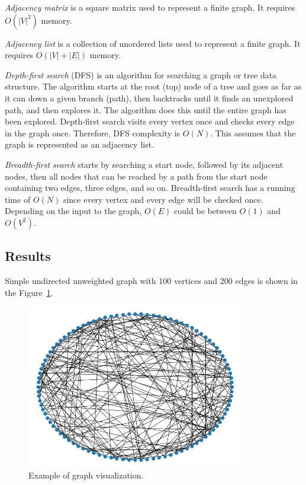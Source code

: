 \textit{Adjacency matrix} is a square matrix used to represent a finite graph.
It requires $O(\lvert V \rvert^2)$ memory.

\textit{Adjacency list} is a collection of unordered lists used to represent a finite graph.
It requires $O(\lvert V \rvert + \lvert E \rvert)$ memory.

\textit{Depth-first search} (DFS) is an algorithm for searching a graph or tree data structure.
The algorithm starts at the root (top) node of a tree and goes as far as it can down a given branch (path), then backtracks until it finds an unexplored path, and then explores it.
The algorithm does this until the entire graph has been explored.
Depth-first search visits every vertex once and checks every edge in the graph once.
Therefore, DFS complexity is $O(N)$.
This assumes that the graph is represented as an adjacency list.

\textit{Breadth-first search} starts by searching a start node, followed by its adjacent nodes, then all nodes that can be reached by a path from the start node containing two edges, three edges, and so on.
Breadth-first search has a running time of $O(N)$ since every vertex and every edge will be checked once.
Depending on the input to the graph, $O(E)$ could be between $O(1)$ and $O(V^2)$.

\subsection{Results}\label{subsec:results}

Simple undirected unweighted graph with 100 vertices and 200 edges is shown in the Figure~\ref{ris:plot}.

\begin{figure}[H]
    \center
    \includegraphics[width=0.85\textwidth]{img/plot.png}
    \caption{Example of graph visualization.}
    \label{ris:plot}
\end{figure}

